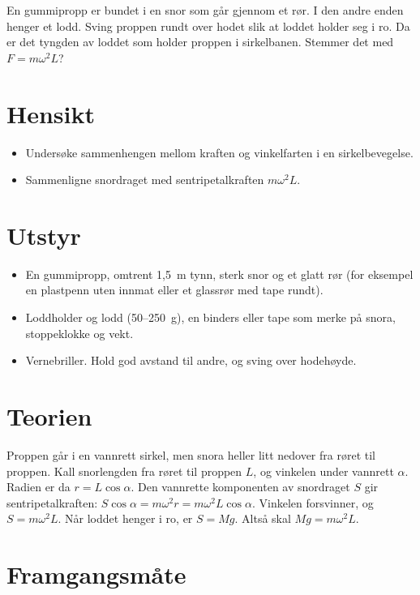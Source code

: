 \documentclass[11pt]{article}
\begin{document}

En gummipropp er bundet i en snor som går gjennom et rør. I den andre enden henger et lodd. Sving proppen rundt over hodet slik at loddet holder seg i ro. Da er det tyngden av loddet som holder proppen i sirkelbanen. Stemmer det med $F = mω^{2}L$?

\section*{Hensikt}

\begin{itemize}
\item Undersøke sammenhengen mellom kraften og vinkelfarten i en sirkelbevegelse.
\item Sammenligne snordraget med sentripetalkraften $mω^{2}L$.
\end{itemize}

\section*{Utstyr}

\begin{itemize}
\item En gummipropp, omtrent 1,5~m tynn, sterk snor og et glatt rør (for eksempel en plastpenn uten innmat eller et glassrør med tape rundt).
\item Loddholder og lodd (50–250~g), en binders eller tape som merke på snora, stoppeklokke og vekt.
\item Vernebriller. Hold god avstand til andre, og sving over hodehøyde.
\end{itemize}

\section*{Teorien}

Proppen går i en vannrett sirkel, men snora heller litt nedover fra røret til proppen. Kall snorlengden fra røret til proppen $L$, og vinkelen under vannrett $α$. Radien er da $r = L \cos  α$. Den vannrette komponenten av snordraget $S$ gir sentripetalkraften: $S \cos  α = mω^{2}r = mω^{2}L \cos  α$. Vinkelen forsvinner, og $S = mω^{2}L$. Når loddet henger i ro, er $S = Mg$. Altså skal $Mg = mω^{2}L$.

\section*{Framgangsmåte}
\end{document}
